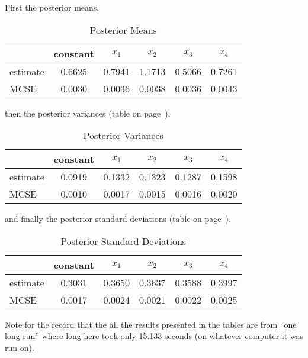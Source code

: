 \documentclass{article}
\begin{document}
First the posterior means,
\begin{table}[ht]
\caption{Posterior Means}
\label{tab:mu}
\begin{center}
\begin{tabular}{lccccc}
  \hline
 & constant & $x_1$ & $x_2$ & $x_3$ & $x_4$ \\
  \hline
estimate & 0.6625 & 0.7941 & 1.1713 & 0.5066 & 0.7261 \\
  MCSE & 0.0030 & 0.0036 & 0.0038 & 0.0036 & 0.0043 \\
   \hline
\end{tabular}\end{center}
\end{table}
then the posterior variances (table on page~\pageref{tab:sigmasq}),
\begin{table}[ht]
\caption{Posterior Variances}
\label{tab:sigmasq}
\begin{center}
\begin{tabular}{lccccc}
  \hline
 & constant & $x_1$ & $x_2$ & $x_3$ & $x_4$ \\
  \hline
estimate & 0.0919 & 0.1332 & 0.1323 & 0.1287 & 0.1598 \\
  MCSE & 0.0010 & 0.0017 & 0.0015 & 0.0016 & 0.0020 \\
   \hline
\end{tabular}\end{center}
\end{table}
and finally the posterior standard deviations
(table on page~\pageref{tab:sigma}).
\begin{table}[ht]
\caption{Posterior Standard Deviations}
\label{tab:sigma}
\begin{center}
\begin{tabular}{lccccc}
  \hline
 & constant & $x_1$ & $x_2$ & $x_3$ & $x_4$ \\
  \hline
estimate & 0.3031 & 0.3650 & 0.3637 & 0.3588 & 0.3997 \\
  MCSE & 0.0017 & 0.0024 & 0.0021 & 0.0022 & 0.0025 \\
   \hline
\end{tabular}\end{center}
\end{table}

Note for the record that the all the results presented in the tables
are from ``one long run'' where long here took only
15.133 seconds (on whatever computer it was run on).
\end{document}
